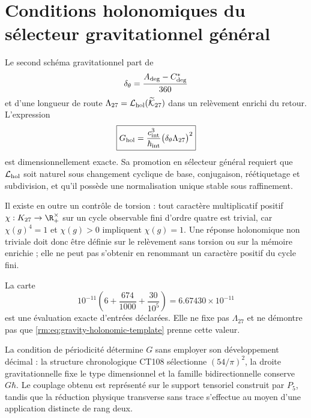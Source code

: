 \section{Conditions holonomiques du sélecteur gravitationnel général}

Le second schéma gravitationnel part de
\begin{equation}
\label{rm:eq:gravity-delta-theta}
\delta_\theta
=\frac{A_{\rm deg}-C^*_{\rm deg}}{360}
\end{equation}
et d'une longueur de route
\(\Lambda_{27}=\mathcal L_{\rm hol}(\widetilde{\mathcal K}_{27})\)
dans un relèvement enrichi du retour. L'expression
\begin{equation}
\label{rm:eq:gravity-holonomic-template}
\boxed{
G_{\rm hol}
=\frac{c_{\rm int}^3}{\hbar_{\rm int}}
\bigl(\delta_\theta\Lambda_{27}\bigr)^2}
\end{equation}
est dimensionnellement exacte. Sa promotion en sélecteur général requiert que
\(\mathcal L_{\rm hol}\) soit naturel sous changement cyclique de base,
conjugaison, réétiquetage et subdivision, et qu'il possède une normalisation
unique stable sous raffinement.

Il existe en outre un contrôle de torsion : tout caractère multiplicatif positif
\(\chi:K_{27}\to\R_+^\times\) sur un cycle observable fini d'ordre
quatre est trivial, car \(\chi(g)^4=1\) et \(\chi(g)>0\) impliquent
\(\chi(g)=1\). Une réponse holonomique non triviale doit donc
être définie sur le relèvement sans torsion ou sur la mémoire
enrichie ; elle ne peut pas
s'obtenir en renommant un caractère positif du cycle fini.

La carte
\begin{equation}
\label{rm:eq:gravity-decimal-chart}
10^{-11}\left(6+\frac{674}{1000}+\frac{30}{10^5}\right)
=6.67430\times10^{-11}
\end{equation}
est une évaluation exacte d'entrées déclarées. Elle ne fixe pas
\(\Lambda_{27}\) et ne démontre pas que \cref{rm:eq:gravity-holonomic-template}
prenne cette valeur.

\begin{keyresult}
La condition de périodicité détermine \(G\) sans employer son développement
décimal : la structure chronologique CT108 sélectionne \((54/\pi)^2\), la
droite gravitationnelle fixe le type dimensionnel et la famille bidirectionnelle
conserve \(G\hbar\). Le couplage obtenu est représenté sur le
support tensoriel construit par \(P_5\), tandis que la réduction
physique transverse sans trace s'effectue au moyen d'une application distincte de
rang deux.
\end{keyresult}

